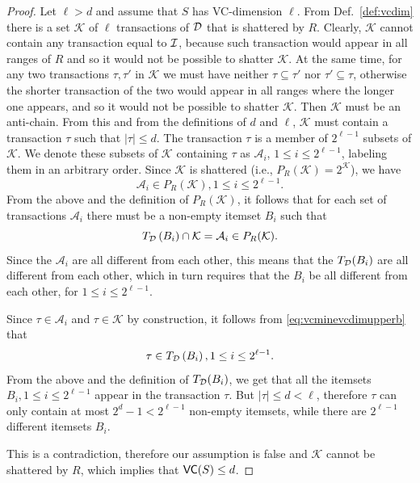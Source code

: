 \begin{proof}
  Let $\ell>d$ and assume that $S$ has
  VC-dimension $\ell$. From Def.~\ref{def:vcdim} there is a set $\mathcal{K}$ of $\ell$
  transactions of ${\cal D}$ that is shattered by $R$. Clearly, $\mathcal{K}$ cannot
  contain any transaction equal to ${\cal I}$, because such transaction would appear
  in all ranges of $R$ and so it would not be possible to shatter $\mathcal{K}$.
  At the same time, for any two transactions $\tau,\tau'$ in
  $\mathcal{K}$ we must have neither $\tau\subseteq\tau'$ nor
  $\tau'\subseteq\tau$, otherwise the shorter transaction of the two would appear in
  all ranges where the longer one appears, and so it would not be possible to
  shatter $\mathcal{K}$. Then $\mathcal{K}$ must be an anti-chain. From this and
  from the definitions of $d$ and $\ell$, $\mathcal{K}$ must contain a
  transaction $\tau$ such that $|\tau|\le d$. %
  The transaction
  $\tau$ is a member of $2^{\ell-1}$ subsets of $\mathcal{K}$. We denote these subsets of $\mathcal{K}$ containing $\tau$ as
  $\mathcal{A}_i$, $1\le i\le 2^{\ell-1}$, labeling them in an
  arbitrary order. Since $\mathcal{K}$ is shattered (i.e., $P_R(\mathcal{K})=2^\mathcal{K}$), we have
  \[ 
  \mathcal{A}_i\in P_R(\mathcal{K}), 1\le i\le 2^{\ell -1}.
  \]
  From the above and the definition of $P_R(\mathcal{K})$, it follows that for
  each set of transactions $\mathcal{A}_i$ there must be a
  non-empty itemset $B_i$ such that 
  \begin{equation}\label{eq:vcminevcdimupperb}
  T_{\cal D}\left(B_i\right)\cap \mathcal{K}= \mathcal{A}_i \in P_R(\mathcal{K}).
  \end{equation}
  Since the $\mathcal{A}_i$ are all different from each other, this
  means that the $T_{\cal D}(B_i)$ are all different from each other, which
  in turn requires that the $B_i$ be all different from each other,
  for $1\le i\le 2^{\ell-1}$. 

  Since $\tau \in \mathcal{A}_i$ and $\tau \in \mathcal{K}$ by
  construction, it follows from \eqref{eq:vcminevcdimupperb} that 
  \[
  \tau \in T_{\cal D}\left(B_i\right), 1\le i\le 2^{\ell-1}.
  \]
  From the above and the definition of $T_{\cal D}(B_i)$, we get that all the
  itemsets $B_i, 1\le i\le 2^{\ell-1}$ appear in the transaction
  $\tau$. But $|\tau|\le d < \ell$, therefore $\tau$ can only contain at most $2^d-1 <
  2^{\ell -1}$ non-empty itemsets, while there are $2^{\ell-1}$ different
  itemsets $B_i$.

  This is a contradiction, therefore our assumption is false and
  $\mathcal{K}$ cannot be shattered by $R$, which implies that $\mathsf{VC}(S)\le d$.
\end{proof}

